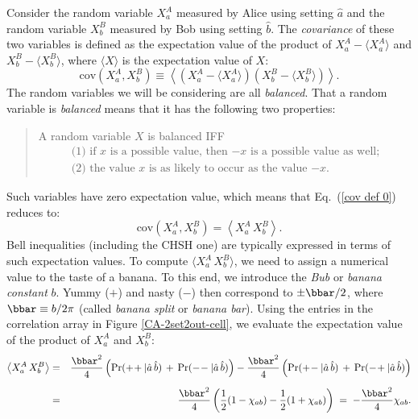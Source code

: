 Consider the random variable $X_a^A$ measured by Alice using setting $\hat{a}$ and the random variable $X_b^B$ measured by Bob using setting $\hat{b}$. The  \emph{covariance} of these two variables is defined as the expectation value of the product of $X_a^A - \langle X_a^A \rangle$ and $X_b^B - \langle X_b^B \rangle$, where $\langle X \rangle$ is the expectation value of $X$:
\begin{equation}
\mathrm{cov} \! \left( X_a^A, X_b^B \right) \equiv \left\langle \left( X_a^A - \langle X_a^A \rangle \right) \left( X_b^B - \langle X_b^B \rangle \right) \right\rangle.
\label{cov def 0}
\end{equation}
The random variables we will be considering are all \emph{balanced}. That a random variable is \emph{balanced} means that it has the following two properties:
\begin{quote}
A random variable $X$ is balanced IFF
\begin{equation}
\begin{array}{l}
\text{(1) if $x$ is a possible value, then $-x$ is a possible value as well;} \\[.2cm]
\text{(2) the value $x$ is as likely to occur as the value $-x$.} 
\end{array}
\label{def balanced}
\end{equation}
\end{quote}
Such variables have zero expectation value, which means that Eq.\ (\ref{cov def 0}) reduces to:
\begin{equation}
\mathrm{cov} \! \left( X_a^A, X_b^B \right) = \left\langle  X_a^A \, X_b^B \right\rangle.
\label{cov def}
\end{equation}
Bell inequalities (including the CHSH one) are typically expressed in terms of such expectation values. To compute $\langle  X_a^A \, X_b^B \rangle$, we need to assign a numerical value to the taste of a banana. To this end, we introduce the \emph{Bub} or \emph{banana constant} $b$. Yummy ($+$) and nasty ($-$) then correspond to $\pm \bbar/2$, where $\bbar \equiv b/2\pi$ (called \emph{banana split} or \emph{banana bar}). Using the entries in the correlation array in Figure \ref{CA-2set2out-cell}, we evaluate the expectation value of the product of $X_a^A$ and $X_b^B$:
\begin{eqnarray}
\left\langle X_a^A \, X_b^B \right\rangle & = & \frac{\bbar^2}{4} \left(\mathrm{Pr}(+\!+| \hat{a} \,\hat{b}) \, + \, \mathrm{Pr}(-\!-| \hat{a} \,\hat{b})\right) 
- \frac{\bbar^2}{4} \left(\mathrm{Pr}(+\!-| \hat{a} \,\hat{b}) \, + \, \mathrm{Pr}(-\!+| \hat{a} \,\hat{b})\right) \nonumber \\[.2 cm]
& = & \frac{\bbar^2}{4} \left( \frac12 (1 - \chi_{ab}) - \frac12 (1 + \chi_{ab}) \right) \; = \; -\frac{\bbar^2}{4} \chi_{ab}.
\label{prob 2 exp}
\end{eqnarray}
